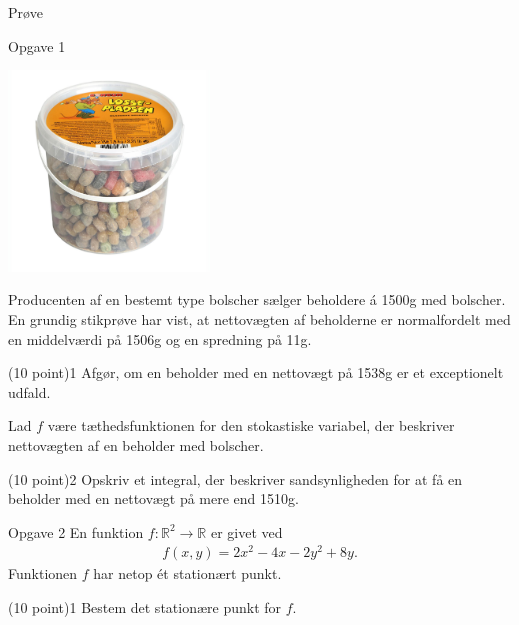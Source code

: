 \documentclass[12pt,x11names,a4paper]{article}
\begin{document}
\newpage
\begin{center}
\LARGE
Prøve
\end{center}

\begin{opgavetekst}{Opgave 1}
	\begin{center}
		\includegraphics[width=0.4\textwidth]{Billeder/Losseplads.jpg}
	\end{center}
	Producenten af en bestemt type bolscher sælger beholdere á 1500g med bolscher. En grundig stikprøve har vist, at nettovægten af beholderne er normalfordelt med 
	en middelværdi på 1506g og en spredning på 11g. 
\end{opgavetekst}
\begin{delopgave}{(10 point)}{1}
	Afgør, om en beholder med en nettovægt på 1538g er et exceptionelt udfald. 
\end{delopgave}
\begin{meretekst}
	Lad $f$ være tæthedsfunktionen for den stokastiske variabel, der beskriver nettovægten af en beholder med bolscher.
\end{meretekst}
\begin{delopgave}{(10 point)}{2}
	Opskriv et integral, der beskriver sandsynligheden for at få en beholder med en nettovægt på mere end 1510g.
\end{delopgave}


\begin{opgavetekst}{Opgave 2}
	En funktion $f:\mathbb{R}^2 \to \mathbb{R}$ er givet ved
	\begin{align*}
		f(x,y) = 2x^2-4x-2y^2+8y.
	\end{align*}
	Funktionen $f$ har netop ét stationært punkt.
\end{opgavetekst}
\begin{delopgave}{(10 point)}{1}
	Bestem det stationære punkt for $f$. 
\end{delopgave}
\end{document}
